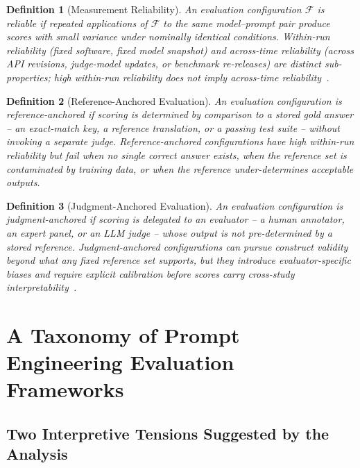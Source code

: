 \documentclass[acmsmall, nonacm, screen]{acmart}
\newtheorem{definition}{Definition}
\begin{document}
\begin{definition}[Measurement Reliability]
An evaluation configuration $\mathcal{F}$ is reliable if repeated
applications of $\mathcal{F}$ to the same model--prompt pair produce
scores with small variance under nominally identical conditions.
\textit{Within-run reliability} (fixed software, fixed model
snapshot) and \textit{across-time reliability} (across API revisions,
judge-model updates, or benchmark re-releases) are distinct
sub-properties; high within-run reliability does not imply
across-time reliability~\cite{subramonian2023takeoneforteam}.
\end{definition}

\begin{definition}[Reference-Anchored Evaluation]
An evaluation configuration is \textit{reference-anchored} if scoring
is determined by comparison to a stored gold answer -- an exact-match
key, a reference translation, or a passing test suite -- without
invoking a separate judge. Reference-anchored configurations have
high within-run reliability but fail when no single correct answer
exists, when the reference set is contaminated by training data, or
when the reference under-determines acceptable outputs.
\end{definition}

\begin{definition}[Judgment-Anchored Evaluation]
An evaluation configuration is \textit{judgment-anchored} if scoring
is delegated to an evaluator -- a human annotator, an expert panel,
or an LLM judge -- whose output is not pre-determined by a stored
reference. Judgment-anchored configurations can pursue construct
validity beyond what any fixed reference set supports, but they
introduce evaluator-specific biases and require explicit calibration
before scores carry cross-study interpretability~\cite{gu2025llmjudge,
feng2025sage}.
\end{definition}

\section{A Taxonomy of Prompt Engineering Evaluation Frameworks}
\label{sec:taxonomy}

\subsection{Two Interpretive Tensions Suggested by the Analysis}
\label{subsec:tensions}
\end{document}
